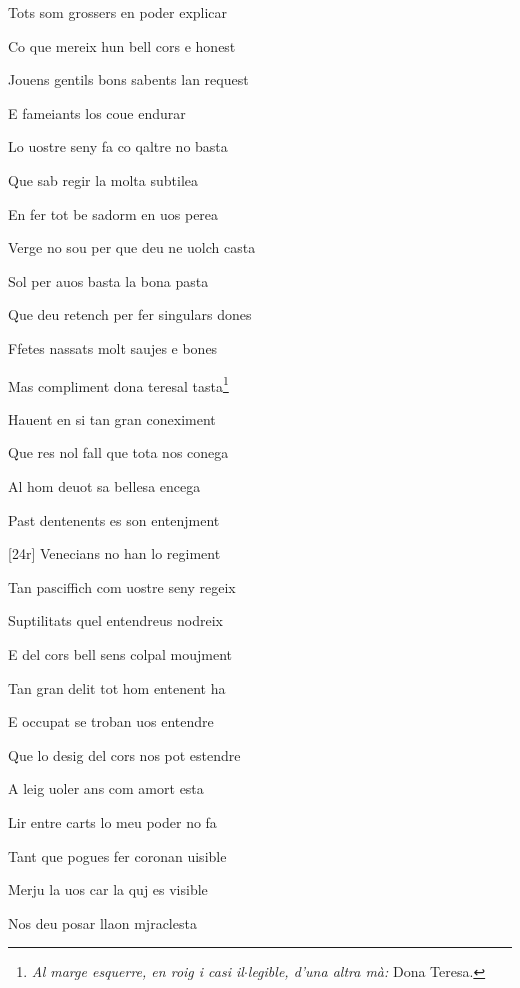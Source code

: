 \documentclass[12pt]{article}
\begin{document}
\begin{estrofa}

 Tots som grossers en poder explicar

 Co que mereix hun bell cors e honest

 Jouens gentils bons sabents lan request

 E fameiants los coue endurar

 Lo uostre seny fa co qaltre no basta

 Que sab regir la molta subtilea

 En fer tot be sadorm en uos perea

 Verge no sou per que deu ne uolch casta

\end{estrofa}



\begin{estrofa}

 Sol per auos basta la bona pasta

 Que deu retench per fer singulars dones

 Ffetes nassats molt saujes e bones

 Mas compliment dona teresal tasta\footnote{\textit{Al marge esquerre, en roig i
casi il$\cdot{}$legible, d'una altra m\`{a}: }Dona Teresa.}

 Hauent en si tan gran coneximent

 Que res nol fall que tota nos conega

 Al hom deuot sa bellesa encega

 Past dentenents es son entenjment

\end{estrofa}



\begin{estrofa}

 [24r] Venecians no han lo regiment

 Tan pasciffich com uostre seny regeix

 Suptilitats quel entendreus nodreix

 E del cors bell sens colpal moujment

 Tan gran delit tot hom entenent ha

 E occupat se troban uos entendre

 Que lo desig del cors nos pot estendre

 A leig uoler ans com amort esta

\end{estrofa}



\begin{estrofa}

 Lir entre carts lo meu poder no fa

 Tant que pogues fer coronan uisible

 Merju la uos car la quj es visible

 Nos deu posar llaon mjraclesta

\end{estrofa}
\end{document}
